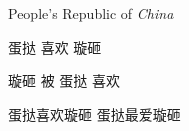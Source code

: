 \documentclass{ctexart}
\newcommand{\PRC}{People's Republic of \emph{China}}	%
\newcommand{\loves}[2]{#1 喜欢 #2}
\newcommand{\loved}[2]{#2 被 #1 喜欢}
\newcommand{\love}[3][喜欢]{#2#1#3}
\begin{document}
	\PRC
	
	\loves{蛋挞}{璇砸}
	
	\loved{蛋挞}{璇砸}
	
	\love{蛋挞}{璇砸}
	\love[最爱]{蛋挞}{璇砸}
	
\end{document}

